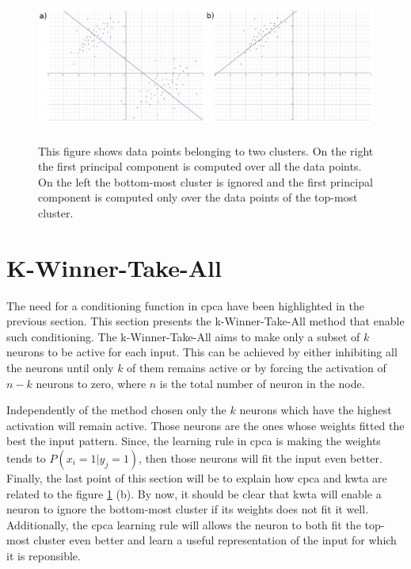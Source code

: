 \documentclass[11pt]{report}
\begin{document}
\begin{figure}[h]
\centering
\includegraphics[width=15cm, height=5cm]{heterogeneous_data}
\caption[Illustration of data points belonging to two clusters]{This figure shows data points belonging to two clusters. On the right the first principal component is computed over all the data points. On the left the bottom-most cluster is ignored and the first principal component is computed only over the data points of the top-most cluster.}
\label{fig:heterogeneous_data}
\end{figure}

\section{K-Winner-Take-All} \label{sec:kwta}

The need for a conditioning function in \acrshort{cpca} have been highlighted in the previous section. This section presents the k-Winner-Take-All method that enable such conditioning. The k-Winner-Take-All aims to make only a subset of $k$ neurons to be active for each input. This can be achieved by either inhibiting all the neurons until only $k$ of them remains active or by forcing the activation of $n - k$ neurons to zero, where $n$ is the total number of neuron in the node.\newline

\noindent Independently of the method chosen only the $k$ neurons which have the highest activation will remain active. Those neurons are the ones whose weights fitted the best the input pattern. Since, the learning rule in \acrshort{cpca} is making the weights tends to $P(x_i = 1 | y_j = 1)$, then those neurons will fit the input even better. Finally, the last point of this section will be to explain how \acrshort{cpca} and \acrshort{kwta} are related to the figure \ref{fig:heterogeneous_data} (b). By now, it should be clear that \acrshort{kwta} will enable a neuron to ignore the bottom-most cluster if its weights does not fit it well. Additionally, the \acrshort{cpca} learning rule will allows the neuron to both fit the top-most cluster even better and learn a useful representation of the input for which it is reponsible.
\end{document}
